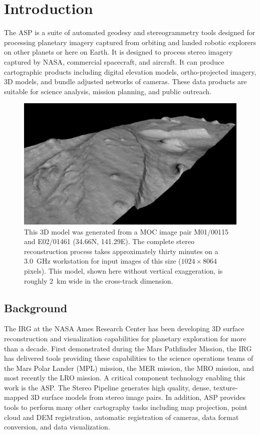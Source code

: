 \chapter{Introduction}

\acresetall

The  \ac{ASP} is a suite of automated geodesy and
stereogrammetry tools designed for processing planetary imagery
captured from orbiting and landed robotic explorers on other planets
or here on Earth.  It is designed to process stereo imagery captured
by \ac{NASA}, commercial spacecraft, and aircraft.  It can produce cartographic
products including digital elevation models, ortho-projected imagery,
3D models, and bundle adjusted networks of cameras.
These data products are suitable for science analysis, mission
planning, and public outreach.

\begin{figure}[tb]
   \centering
   \includegraphics[width=6.5in]{images/introduction/p19view2_400px.png}
   \caption{This 3D model was generated from a \acf{MOC} image
     pair M01/00115 and E02/01461 (34.66N, 141.29E).  The complete
     stereo reconstruction process takes approximately thirty minutes on
     a 3.0~GHz workstation for input images of this size ($1024 \times 8064$
     pixels).  This model, shown here without vertical
     exaggeration, is roughly 2~km wide in the cross-track
     dimension. }
   \label{fig:p19}
\end{figure}

\section{Background}

The \ac{IRG} at the NASA Ames Research Center has been developing
3D surface reconstruction and visualization capabilities for planetary
exploration for more than a decade.  First demonstrated during the
Mars Pathfinder Mission, the \ac{IRG} has delivered tools providing
these capabilities to the science operations teams of the Mars Polar
Lander (MPL) mission, the \ac{MER} mission, the \ac{MRO} mission,
and most recently the \ac{LRO} mission. A critical component
technology enabling this work is the \acf{ASP}.  The Stereo Pipeline
generates high quality, dense, texture-mapped 3D surface models
from stereo image pairs.  In addition, ASP provides tools to
perform many other cartography tasks including map projection, 
point cloud and DEM registration, automatic registration of 
cameras, data format conversion, and data visualization.

